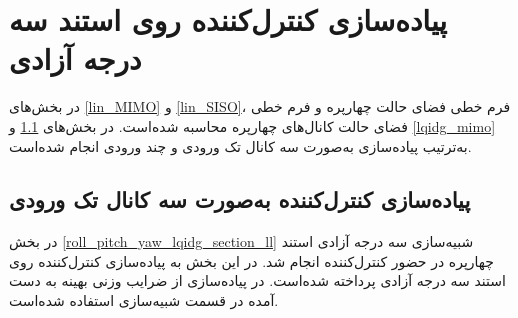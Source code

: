 \section{پیاده‌سازی کنترل‌کننده روی استند سه درجه آزادی}\label{3DOF_lqidg_section}
در بخش‌های
\ref{lin_MIMO}
و
\ref{lin_SISO}،
فرم خطی فضای حالت چهارپره و فرم خطی فضای حالت کانال‌های چهارپره محاسبه شده‌است. در بخش‌های
\ref{lqidg_siso}
و
\ref{lqidg_mimo}
به‌ترتیب پیاده‌سازی به‌صورت سه کانال تک ورودی و چند ورودی انجام شده‌است.

\subsection{پیاده‌سازی کنترل‌کننده به‌صورت سه کانال تک ورودی}\label{lqidg_siso}
در بخش
\ref{roll_pitch_yaw_lqidg_section_ll}
شبیه‌سازی سه درجه آزادی استند چهارپره در حضور کنترل‌کننده  انجام شد. در این بخش به پیاده‌سازی کنترل‌کننده  روی استند سه درجه آزادی پرداخته شده‌است.
در پیاده‌سازی از ضرایب وزنی بهینه به دست آمده در قسمت شبیه‌سازی استفاده شده‌است.


